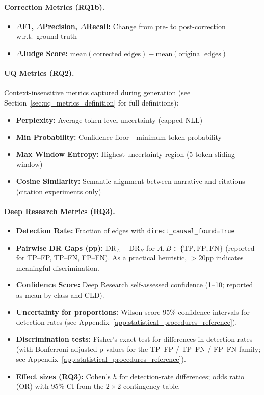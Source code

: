 \paragraph{Correction Metrics (RQ1b).}
\begin{itemize}[noitemsep]
    \item \textbf{$\Delta$F1, $\Delta$Precision, $\Delta$Recall:} Change from pre- to post-correction w.r.t.\ ground truth
    \item \textbf{$\Delta$Judge Score:} $\text{mean}(\text{corrected edges}) - \text{mean}(\text{original edges})$
\end{itemize}

\paragraph{UQ Metrics (RQ2).} Context-insensitive metrics captured during generation (see Section~\ref{sec:uq_metrics_definition} for full definitions):
\begin{itemize}[noitemsep]
    \item \textbf{Perplexity:} Average token-level uncertainty (capped NLL)
    \item \textbf{Min Probability:} Confidence floor---minimum token probability
    \item \textbf{Max Window Entropy:} Highest-uncertainty region (5-token sliding window)
    \item \textbf{Cosine Similarity:} Semantic alignment between narrative and citations (citation experiments only)
\end{itemize}

\paragraph{Deep Research Metrics (RQ3).}
\begin{itemize}[noitemsep]
    \item \textbf{Detection Rate:} Fraction of edges with \texttt{direct\_causal\_found=True}
    \item \textbf{Pairwise DR Gaps (pp):} $\text{DR}_{A} - \text{DR}_{B}$ for $A,B\in\{\text{TP},\text{FP},\text{FN}\}$ (reported for TP--FP, TP--FN, FP--FN). As a practical heuristic, $>20$pp indicates meaningful discrimination.
    \item \textbf{Confidence Score:} Deep Research self-assessed confidence (1--10; reported as mean by class and CLD).
    \item \textbf{Uncertainty for proportions:} Wilson score 95\% confidence intervals for detection rates (see Appendix~\ref{app:statistical_procedures_reference}).
    \item \textbf{Discrimination tests:} Fisher's exact test for differences in detection rates (with Bonferroni-adjusted p-values for the TP--FP / TP--FN / FP--FN family; see Appendix~\ref{app:statistical_procedures_reference}).
    \item \textbf{Effect sizes (RQ3):} Cohen's $h$ for detection-rate differences; odds ratio (OR) with 95\% CI from the $2\times2$ contingency table.
\end{itemize}

